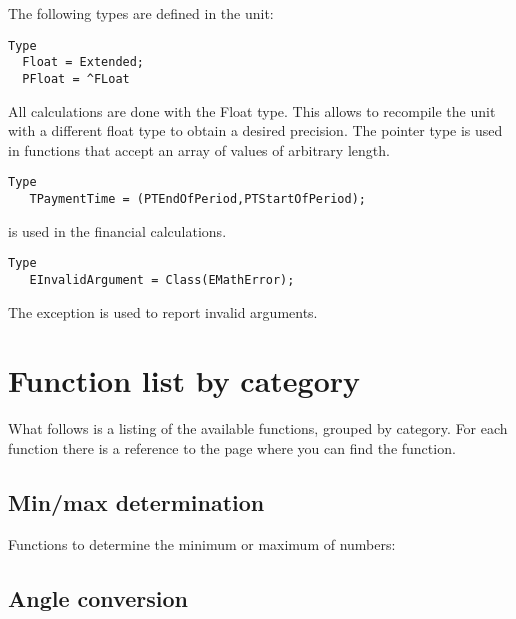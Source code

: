 The following types are defined in the  unit:
\begin{verbatim}
Type
  Float = Extended;
  PFloat = ^FLoat
\end{verbatim}
All calculations are done with the Float type. This allows to
recompile the unit with a different float type to obtain a
desired precision. The pointer type is used in functions that accept
an array of values of arbitrary length.
\begin{verbatim}
Type
   TPaymentTime = (PTEndOfPeriod,PTStartOfPeriod);
\end{verbatim}
 is used in the financial calculations.
\begin{verbatim}
Type
   EInvalidArgument = Class(EMathError);
\end{verbatim}
The  exception is used to report invalid arguments.

\section{Function list by category}
What follows is a listing of the available functions, grouped by category.
For each function there is a reference to the page where you can find the
function.
\subsection{Min/max determination}
Functions to determine the minimum or maximum of numbers:
\begin{funclist}
\end{funclist}
\subsection{Angle conversion}
\begin{funclist}
\end{funclist}
